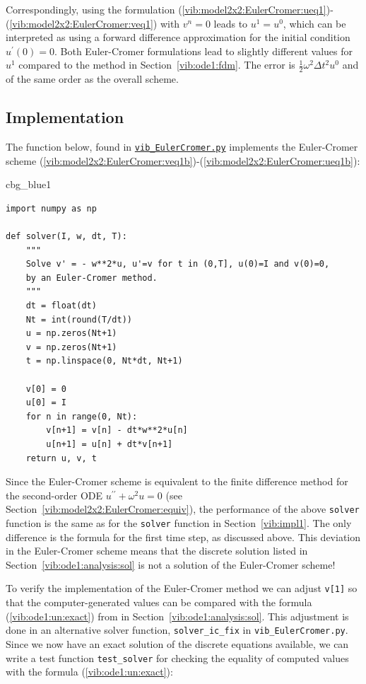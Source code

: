 \documentclass[%
oneside,                 %
final,                   %
10pt]{article}
\newenvironment{_cod_tight}[1]{
   \def\FrameCommand{\colorbox{#1}}
   \FrameRule0.6pt\MakeFramed {\FrameRestore}\vskip3mm}
   {\vskip0mm\endMakeFramed}
\newenvironment{cod}[1]{
\bgroup\rmfamily
\fboxsep=0mm\relax
\begin{_cod_tight}{#1}
\list{}{\parsep=-2mm\parskip=0mm\topsep=0pt\leftmargin=2mm
\rightmargin=2\leftmargin\leftmargin=4pt\relax}
\item\relax}
{\endlist\end{_cod_tight}\egroup}
\begin{document}
Correspondingly, using the formulation
(\ref{vib:model2x2:EulerCromer:ueq1})-(\ref{vib:model2x2:EulerCromer:veq1})
with $v^n=0$ leads to $u^1=u^0$, which can be interpreted as using
a forward difference approximation for the initial condition $u^{\prime}(0)=0$.
Both Euler-Cromer formulations lead to slightly different values for
$u^1$ compared to the method in Section~\ref{vib:ode1:fdm}.
The error is $\frac{1}{2}\omega^2\Delta t^2 u^0$ and of the same order
as the overall scheme.


\subsection{Implementation}
\label{vib:model2x2:EulerCromer:impl}

The function below, found in \href{{http://tinyurl.com/nm5587k/vib/vib_EulerCromer.py}}{\nolinkurl{vib_EulerCromer.py}} implements the Euler-Cromer scheme
(\ref{vib:model2x2:EulerCromer:veq1b})-(\ref{vib:model2x2:EulerCromer:ueq1b}):

\begin{cod}{cbg_blue1}\begin{Verbatim}[numbers=none,fontsize=\fontsize{9pt}{9pt},baselinestretch=0.95,xleftmargin=2mm]
import numpy as np

def solver(I, w, dt, T):
    """
    Solve v' = - w**2*u, u'=v for t in (0,T], u(0)=I and v(0)=0,
    by an Euler-Cromer method.
    """
    dt = float(dt)
    Nt = int(round(T/dt))
    u = np.zeros(Nt+1)
    v = np.zeros(Nt+1)
    t = np.linspace(0, Nt*dt, Nt+1)

    v[0] = 0
    u[0] = I
    for n in range(0, Nt):
        v[n+1] = v[n] - dt*w**2*u[n]
        u[n+1] = u[n] + dt*v[n+1]
    return u, v, t
\end{Verbatim}
\end{cod}
\noindent

Since the Euler-Cromer scheme is equivalent to the finite difference
method for the second-order ODE $u^{\prime\prime}+\omega^2u=0$ (see Section~\ref{vib:model2x2:EulerCromer:equiv}), the performance of the above
\texttt{solver} function is the same as for the \texttt{solver} function in Section~\ref{vib:impl1}. The only difference is the formula for the first time
step, as discussed above.  This deviation in the Euler-Cromer scheme
means that the discrete solution listed in Section~\ref{vib:ode1:analysis:sol} is not a solution of the Euler-Cromer
scheme!

To verify the implementation of the Euler-Cromer method we
can adjust \texttt{v[1]} so that the computer-generated values can be
compared with the formula
(\ref{vib:ode1:un:exact}) from in Section~\ref{vib:ode1:analysis:sol}. This
adjustment is done in an alternative solver function, \Verb!solver_ic_fix!
in \Verb!vib_EulerCromer.py!. Since we now have an exact solution of the
discrete equations available, we can write a test function
\Verb!test_solver! for checking the equality of computed values with the
formula (\ref{vib:ode1:un:exact}):
\end{document}

